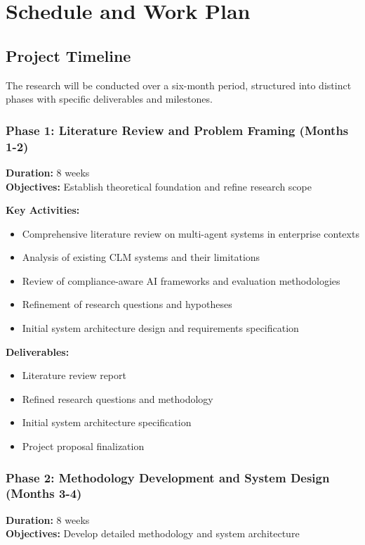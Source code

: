 
\chapter{Schedule and Work Plan}\label{chapter:schedule}

\section{Project Timeline}

The research will be conducted over a six-month period, structured into distinct phases with specific deliverables and milestones.

\subsection{Phase 1: Literature Review and Problem Framing (Months 1-2)}
\textbf{Duration:} 8 weeks\\
\textbf{Objectives:} Establish theoretical foundation and refine research scope

\textbf{Key Activities:}
\begin{itemize}
    \item Comprehensive literature review on multi-agent systems in enterprise contexts
    \item Analysis of existing CLM systems and their limitations
    \item Review of compliance-aware AI frameworks and evaluation methodologies
    \item Refinement of research questions and hypotheses
    \item Initial system architecture design and requirements specification
\end{itemize}

\textbf{Deliverables:}
\begin{itemize}
    \item Literature review report
    \item Refined research questions and methodology
    \item Initial system architecture specification
    \item Project proposal finalization
\end{itemize}

\subsection{Phase 2: Methodology Development and System Design (Months 3-4)}
\textbf{Duration:} 8 weeks\\
\textbf{Objectives:} Develop detailed methodology and system architecture

